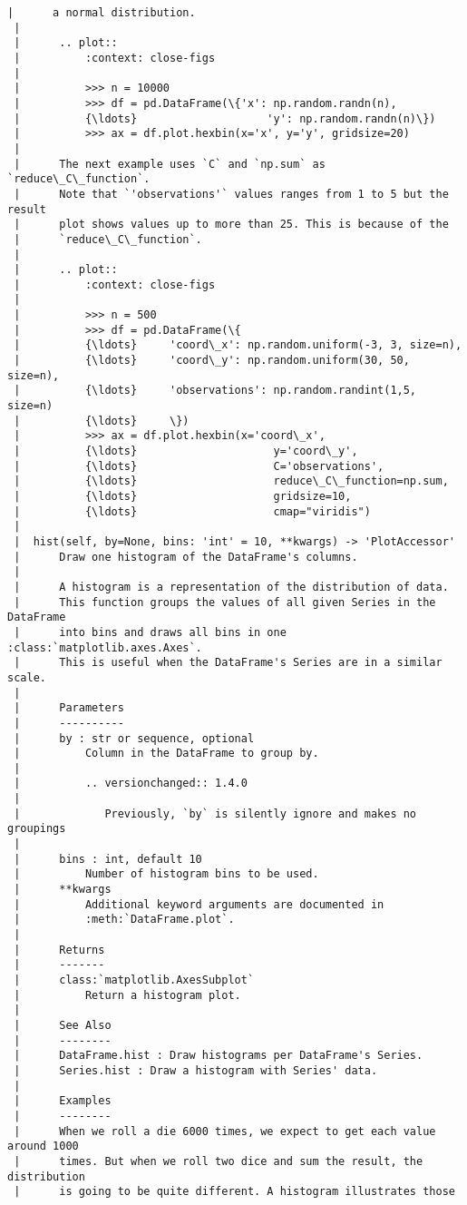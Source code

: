 \documentclass[11pt]{article}
\begin{document}
\begin{Verbatim}[commandchars=\\\{\}]
 |      a normal distribution.
 |
 |      .. plot::
 |          :context: close-figs
 |
 |          >>> n = 10000
 |          >>> df = pd.DataFrame(\{'x': np.random.randn(n),
 |          {\ldots}                    'y': np.random.randn(n)\})
 |          >>> ax = df.plot.hexbin(x='x', y='y', gridsize=20)
 |
 |      The next example uses `C` and `np.sum` as `reduce\_C\_function`.
 |      Note that `'observations'` values ranges from 1 to 5 but the result
 |      plot shows values up to more than 25. This is because of the
 |      `reduce\_C\_function`.
 |
 |      .. plot::
 |          :context: close-figs
 |
 |          >>> n = 500
 |          >>> df = pd.DataFrame(\{
 |          {\ldots}     'coord\_x': np.random.uniform(-3, 3, size=n),
 |          {\ldots}     'coord\_y': np.random.uniform(30, 50, size=n),
 |          {\ldots}     'observations': np.random.randint(1,5, size=n)
 |          {\ldots}     \})
 |          >>> ax = df.plot.hexbin(x='coord\_x',
 |          {\ldots}                     y='coord\_y',
 |          {\ldots}                     C='observations',
 |          {\ldots}                     reduce\_C\_function=np.sum,
 |          {\ldots}                     gridsize=10,
 |          {\ldots}                     cmap="viridis")
 |
 |  hist(self, by=None, bins: 'int' = 10, **kwargs) -> 'PlotAccessor'
 |      Draw one histogram of the DataFrame's columns.
 |
 |      A histogram is a representation of the distribution of data.
 |      This function groups the values of all given Series in the DataFrame
 |      into bins and draws all bins in one :class:`matplotlib.axes.Axes`.
 |      This is useful when the DataFrame's Series are in a similar scale.
 |
 |      Parameters
 |      ----------
 |      by : str or sequence, optional
 |          Column in the DataFrame to group by.
 |
 |          .. versionchanged:: 1.4.0
 |
 |             Previously, `by` is silently ignore and makes no groupings
 |
 |      bins : int, default 10
 |          Number of histogram bins to be used.
 |      **kwargs
 |          Additional keyword arguments are documented in
 |          :meth:`DataFrame.plot`.
 |
 |      Returns
 |      -------
 |      class:`matplotlib.AxesSubplot`
 |          Return a histogram plot.
 |
 |      See Also
 |      --------
 |      DataFrame.hist : Draw histograms per DataFrame's Series.
 |      Series.hist : Draw a histogram with Series' data.
 |
 |      Examples
 |      --------
 |      When we roll a die 6000 times, we expect to get each value around 1000
 |      times. But when we roll two dice and sum the result, the distribution
 |      is going to be quite different. A histogram illustrates those

\end{Verbatim}
\end{document}
